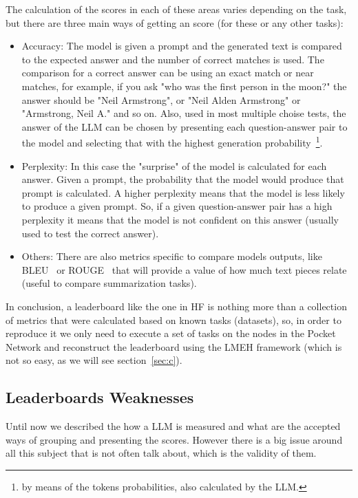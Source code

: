 The calculation of the scores in each of these areas varies depending on the task, but there are three main ways of getting an score (for these or any other tasks):
\begin{itemize}
    \item Accuracy: The model is given a prompt and the generated text is compared to the expected answer and the number of correct matches is used. The comparison for a correct answer can be using an exact match or near matches, for example, if you ask "who was the first person in the moon?" the answer should be "Neil Armstrong", or "Neil Alden Armstrong" or "Armstrong, Neil A." and so on. Also, used in most multiple choise tests, the answer of the \gls{LLM} can be chosen by presenting each question-answer pair to the model and selecting that with the highest generation probability~\footnote{by means of the tokens probabilities, also calculated by the \gls{LLM}.}.
    \item Perplexity: In this case the "surprise"  of the model is calculated for each answer. Given a prompt, the probability that the model would produce that prompt is calculated. A higher perplexity means that the model is less likely to produce a given prompt. So, if a given question-answer pair has a high perplexity it means that the model is not confident on this answer (usually used to  test the correct answer).
    \item Others: There are also metrics specific to compare models outputs, like BLEU~\cite{papineni2002bleu} or ROUGE~\cite{lin2004rouge} that will provide a value of how much text pieces relate (useful to compare summarization tasks).
\end{itemize}

In conclusion, a leaderboard like the one in \gls{HF} is nothing more than a collection of metrics that were calculated based on known tasks (datasets), so, in order to reproduce it we only need to execute a set of tasks on the nodes in the Pocket Network and reconstruct the leaderboard using the \gls{LMEH} framework (which is not so easy, as we will see section~\ref{sec:c}). 


\subsection{Leaderboards Weaknesses}

Until now we described the how a \gls{LLM} is measured and what are the accepted ways of grouping and presenting the scores. However there is a big issue around all this subject that is not often talk about, which is the validity of them.

